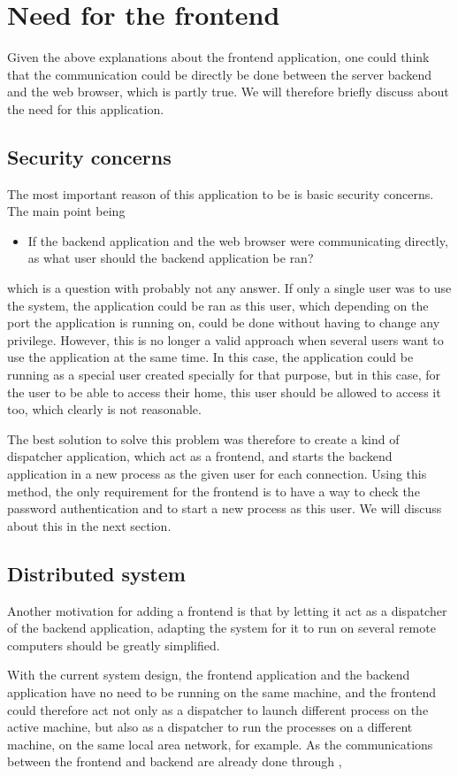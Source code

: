 \section{Need for the frontend}
Given the above explanations about the frontend application, one could 
think that the communication could be directly be done between the 
server backend and the web browser, which is partly true. We will therefore
briefly discuss about the need for this application.
%
\subsection{Security concerns}
The most important reason of this application to be is basic security concerns. 
The main point being
\begin{itemize}
\item If the backend application and the web browser were communicating directly, 
  as what user should the backend application be ran?   
\end{itemize}
which is a question with probably not any answer. If only a single user was to 
use the system, the application could be ran as this user, which depending on the 
port the application is running on, could be done without having to change any privilege.
However, this is no longer a valid approach when several users want to use the application 
at the same time. In this case, the application could be running as a special user 
created specially for that purpose, but in this case, for the user to be able to access 
their home, this user should be allowed to access it too, which clearly is not reasonable.

The best solution to solve this problem was therefore to create a kind of dispatcher application, 
which act as a frontend, and starts the backend application in a new process as the given user 
for each connection. Using this method, the only requirement for the frontend is to have a
way to check the password authentication and to start a new process as this user. We will 
discuss about this in the next section.
%
\subsection{Distributed system}
Another motivation for adding a frontend is that by letting it act as a dispatcher 
of the backend application, adapting the system for it to run on several remote computers
should be greatly simplified. 

With the current system design, the frontend application and the backend application have no need 
to be running on the same machine, and the frontend could therefore act not only as a dispatcher 
to launch different process on the active machine, but also as a dispatcher to run the processes 
on a different machine, on the same local area network, for example. As the communications 
between the frontend and backend are already done through , 